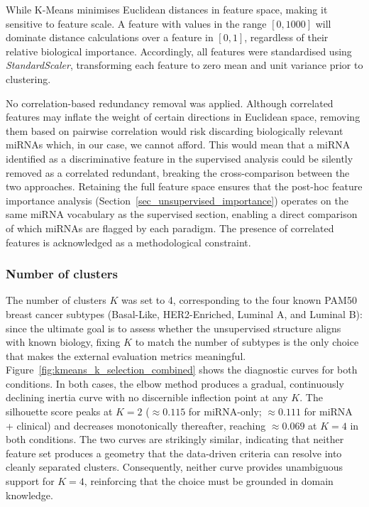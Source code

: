 While K-Means minimises Euclidean distances in feature space, making it sensitive to feature scale.
A feature with values in the range $[0, 1000]$ will dominate distance calculations over a
feature in $[0, 1]$, regardless of their relative biological importance.
Accordingly, all features were standardised using \textit{StandardScaler}, transforming each
feature to zero mean and unit variance prior to clustering.

No correlation-based redundancy removal was applied. Although correlated features may inflate
the weight of certain directions in Euclidean space, removing
them based on pairwise correlation would risk discarding biologically relevant miRNAs which, 
in our case, we cannot afford. This would mean that a miRNA identified as a discriminative 
feature in the supervised analysis could be
silently removed as a correlated redundant, breaking the cross-comparison between the two
approaches. Retaining the full feature space ensures that the post-hoc feature importance
analysis (Section~\ref{sec_unsupervised_importance}) operates on the same miRNA vocabulary as
the supervised section, enabling a direct comparison of which miRNAs are flagged by each
paradigm. The presence of correlated features is acknowledged as a methodological constraint.

\subsubsection{Number of clusters}

The number of clusters $K$ was set to 4, corresponding to the four known PAM50 breast
cancer subtypes (Basal-Like, HER2-Enriched, Luminal A, and Luminal B): since the
ultimate goal is to assess whether the unsupervised structure aligns with known biology,
fixing $K$ to match the number of subtypes is the only choice that makes the external
evaluation metrics meaningful. Figure~\ref{fig:kmeans_k_selection_combined} shows the
diagnostic curves for both conditions. In both cases, the elbow method produces a
gradual, continuously declining inertia curve with no discernible inflection point at
any $K$. The silhouette score peaks at $K = 2$ ($\approx 0.115$ for miRNA-only;
$\approx 0.111$ for miRNA + clinical) and decreases monotonically thereafter, reaching
$\approx 0.069$ at $K = 4$ in both conditions. The two curves are strikingly similar,
indicating that neither feature set produces a geometry that the data-driven criteria
can resolve into cleanly separated clusters. Consequently, neither curve provides
unambiguous support for $K = 4$, reinforcing that the choice must be grounded in domain
knowledge.

